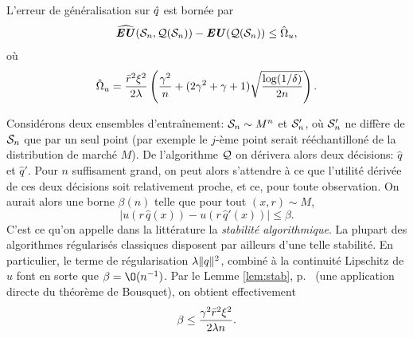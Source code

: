 \begin{thm}
  L'erreur de généralisation sur $\qh$ est bornée par
  \begin{equation}
  \label{b:borneu1}
  \hEU(\S_n,\alg(\S_n)) - \EU(\alg(\S_n)) \leq \hat \Omega_u,
\end{equation}
où
\begin{equation}
  \label{b:borneu2}
  \hat\Omega_u = \frac{\rmax^2\xi^2}{2\lambda}\left(\frac{\gamma^2}{n} + (2\gamma^2+\gamma+1)\sqrt{\frac{\log(1/\delta)}{2n}}\right).
\end{equation}
\end{thm}

Considérons deux ensembles d'entraînement: $\S_n \sim M^n$ et $\S'_n$, où $\S'_n$ ne diffère
de $\S_n$ que par un seul point (par exemple le $j$-ème point serait rééchantilloné de la
distribution de marché $M$). De l'algorithme $\alg$ on dérivera alors deux décisions:
$\hat q$ et $\hat q'$. Pour $n$ suffisament grand, on peut alors s'attendre à ce que
l'utilité dérivée de ces deux décisions soit relativement proche, et ce, pour toute
observation. On aurait alors une borne $\beta(n)$ telle que pour tout $(x,r) \sim M$,
\begin{equation}
  |u(r\,\hat q(x)) - u(r\,\hat q'(x))| \leq \beta.
\end{equation}
C'est ce qu'on appelle dans la littérature la \textit{stabilité algorithmique}. La plupart
des algorithmes régularisés classiques disposent par ailleurs d'une telle stabilité. En
particulier, le terme de régularisation $\lambda \nq{q}^2$, combiné à la continuité Lipschitz de
$u$ font en sorte que $\beta = \O(n^{-1})$. Par le Lemme \ref{lem:stab}, p.~\pageref{lem:stab}
(une application directe du théorème de Bousquet), on obtient effectivement
\begin{equation}
  \beta \leq \frac{\gamma^2\rmax^2\xi^2}{2\lambda n}.
\end{equation}

